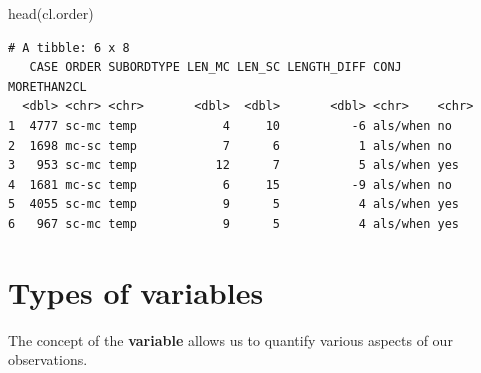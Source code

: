\documentclass[
  11pt,
  letterpaper,
  DIV=11,
  numbers=noendperiod]{scrreprt}
\newenvironment{Shaded}{\begin{snugshade}}{\end{snugshade}}
\newcommand{\FunctionTok}[1]{\textcolor[rgb]{0.28,0.35,0.67}{#1}}
\newcommand{\NormalTok}[1]{\textcolor[rgb]{0.00,0.23,0.31}{#1}}
\begin{document}
\begin{Shaded}
\begin{Highlighting}[]
\FunctionTok{head}\NormalTok{(cl.order)}
\end{Highlighting}
\end{Shaded}

\begin{verbatim}
# A tibble: 6 x 8
   CASE ORDER SUBORDTYPE LEN_MC LEN_SC LENGTH_DIFF CONJ     MORETHAN2CL
  <dbl> <chr> <chr>       <dbl>  <dbl>       <dbl> <chr>    <chr>      
1  4777 sc-mc temp            4     10          -6 als/when no         
2  1698 mc-sc temp            7      6           1 als/when no         
3   953 sc-mc temp           12      7           5 als/when yes        
4  1681 mc-sc temp            6     15          -9 als/when no         
5  4055 sc-mc temp            9      5           4 als/when yes        
6   967 sc-mc temp            9      5           4 als/when yes        
\end{verbatim}

\section{Types of variables}\label{types-of-variables}

The concept of the \textbf{variable} allows us to quantify various
aspects of our observations.
\end{document}

